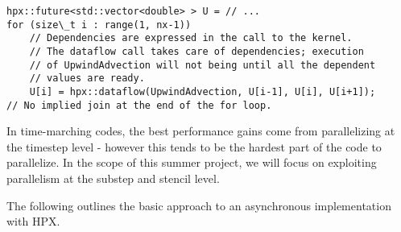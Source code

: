 \documentclass[final,letterpaper,10pt]{article}
\begin{document}
\begin{lstlisting}
hpx::future<std::vector<double> > U = // ...
for (size\_t i : range(1, nx-1))
    // Dependencies are expressed in the call to the kernel.
    // The dataflow call takes care of dependencies; execution
    // of UpwindAdvection will not being until all the dependent
    // values are ready.  
    U[i] = hpx::dataflow(UpwindAdvection, U[i-1], U[i], U[i+1]); 
// No implied join at the end of the for loop.
\end{lstlisting}

In time-marching codes, the best performance gains come from parallelizing at the timestep
level - however this tends to be the hardest part of the code to parallelize. In the scope
of this summer project, we will focus on exploiting parallelism at the substep and stencil
level.

The following outlines the basic approach to an asynchronous implementation with
HPX.
\end{document}
